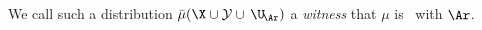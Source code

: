 \begin{defn}[\scibility]
We call such a distribution
$\bar\mu(\X \cup \mathcal Y \cup\, \U_{\!\Ar})$
 a \emph{witness}
    that $\mu$ is \scible\ with $\Ar$.
\end{defn}

